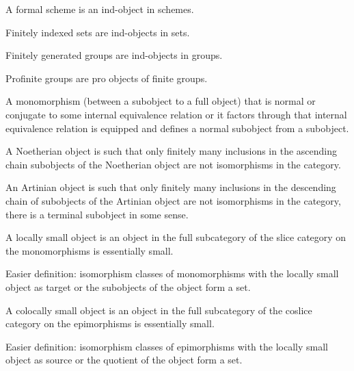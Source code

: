 \begin{example}
    A formal scheme is an ind-object in schemes.

    Finitely indexed sets are ind-objects in sets.

    Finitely generated groups are ind-objects in groups.

    Profinite groups are pro objects of finite groups.
\end{example}

\begin{definition}
    \label{definition-normal-subobject}
    A monomorphism (between a subobject to a full object) that is normal or conjugate to some internal equivalence relation or it factors through that internal equivalence relation is equipped and defines a normal subobject from a subobject.
\end{definition}

\begin{definition}
    \label{definition-noetherian-object}
    A Noetherian object is such that only finitely many inclusions in the ascending chain subobjects of the Noetherian object are not isomorphisms in the category.
\end{definition}

\begin{definition}
    \label{definition-artinian-object}
    An Artinian object is such that only finitely many inclusions in the descending chain of subobjects of the Artinian object are not isomorphisms in the category, there is a terminal subobject in some sense.
\end{definition}

\begin{definition}
    \label{definition-locally-small-object-slice-cat}
    A locally small object is an object in the full subcategory of the slice category on the monomorphisms is essentially small.

    Easier definition: isomorphism classes of monomorphisms with the locally small object as target or the subobjects of the object form a set.
\end{definition}

\begin{definition}
    \label{definition-colocally-small-object-slice-cat}
    A colocally small object is an object in the full subcategory of the coslice category on the epimorphisms is essentially small.

    Easier definition: isomorphism classes of epimorphisms with the locally small object as source or the quotient of the object form a set.
\end{definition}

